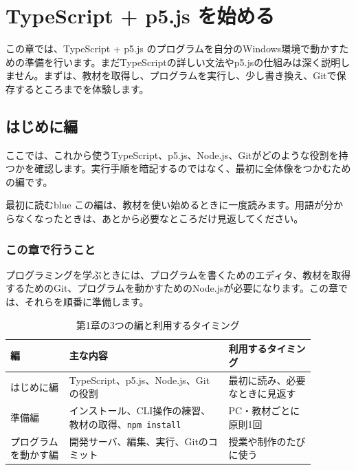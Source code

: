 \chapter{TypeScript + p5.js を始める}
\label{chap:introduction}

この章では、TypeScript + p5.js のプログラムを自分のWindows環境で動かすための準備を行います。まだTypeScriptの詳しい文法やp5.jsの仕組みは深く説明しません。まずは、教材を取得し、プログラムを実行し、少し書き換え、Gitで保存するところまでを体験します。

\section{はじめに編}
ここでは、これから使うTypeScript、p5.js、Node.js、Gitがどのような役割を持つかを確認します。実行手順を暗記するのではなく、最初に全体像をつかむための編です。

\begin{chapterphasebox}{最初に読む}{blue}
この編は、教材を使い始めるときに一度読みます。用語が分からなくなったときは、あとから必要なところだけ見返してください。
\end{chapterphasebox}

\subsection{この章で行うこと}

プログラミングを学ぶときには、プログラムを書くためのエディタ、教材を取得するためのGit、プログラムを動かすためのNode.jsが必要になります。この章では、それらを順番に準備します。

\begin{table}[htbp]
    \centering
    \caption{第1章の3つの編と利用するタイミング}
    \label{tab:chapter01-three-phases}
    \begin{tabular}{p{0.17\linewidth}p{0.46\linewidth}p{0.25\linewidth}}
        \toprule
        編 & 主な内容 & 利用するタイミング \\
        \midrule
        はじめに編
            & TypeScript、p5.js、Node.js、Gitの役割
            & 最初に読み、必要なときに見返す \\
        準備編
            & インストール、CLI操作の練習、教材の取得、\texttt{npm install}
            & PC・教材ごとに原則1回 \\
        プログラムを動かす編
            & 開発サーバ、編集、実行、Gitのコミット
            & 授業や制作のたびに使う \\
        \bottomrule
    \end{tabular}
\end{table}

